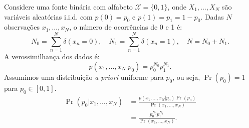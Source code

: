 Considere uma fonte binária com alfabeto $\mathcal{X} = \{0, 1\}$, onde
$X_1, \ldots, X_N$ são variáveis aleatórias i.i.d. com $p(0) = p_0$ e  
$p(1) = p_1 = 1 - p_0$. Dadas $N$ observações $x_1, \ldots, x_N$, o número
de ocorrências de 0 e 1 é:
\begin{equation}
N_0 = \sum_{n=1}^N \delta(x_n = 0), \quad N_1 = \sum_{n=1}^N \delta(x_n = 1), \quad N = N_0 + N_1.
\end{equation}
A verossimilhança dos dados é:
\begin{equation}
p(x_1, \ldots, x_N | p_0) = p_0^{N_0} p_1^{N_1}.
\end{equation}
Assumimos uma distribuição \textit{a priori} uniforme para $p_0$, ou seja, $\Pr(p_0) = 1$ para $p_0 \in [0, 1]$. 
\begin{subequations}\label{eq:Prp0givenx1n}
  \begin{align}
    \Pr(p_0 | x_1, \ldots, x_N) &= \frac{p(x_1, \ldots, x_N | p_0) \Pr(p_0)}{\Pr(x_1, \ldots, x_N)} \\
                                &= \frac{p_0^{N_0} p_1^{N_1}}{\Pr(x_1, \ldots, x_N)}.
  \end{align}
\end{subequations}

